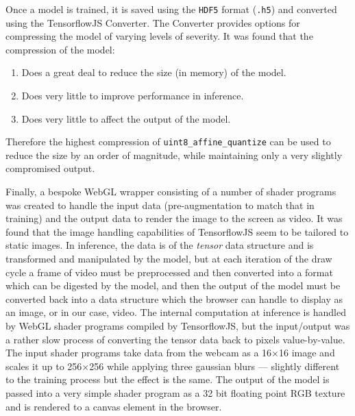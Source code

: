 \documentclass{article}
\begin{document}
Once a model is trained, it is saved using the \verb|HDF5| format (\verb|.h5|) and converted using the TensorflowJS Converter. The Converter provides options for compressing the model of varying levels of severity. It was found that the compression of the model:

\begin{enumerate}
	\item Does a great deal to reduce the size (in memory) of the model.
	\item Does very little to improve performance in inference.
	\item Does very little to affect the output of the model.
\end{enumerate}

Therefore the highest compression of \verb|uint8_affine_quantize| can be used to reduce the size by an order of magnitude, while maintaining only a very slightly compromised output.

Finally, a bespoke WebGL wrapper consisting of a number of shader programs was created to handle the input data (pre-augmentation to match that in training) and the output data to render the image to the screen as video. It was found that the image handling capabilities of TensorflowJS seem to be tailored to static images. In inference, the data is of the \textit{tensor} data structure and is transformed and manipulated by the model, but at each iteration of the draw cycle a frame of video must be preprocessed and then converted into a format which can be digested by the model, and then the output of the model must be converted back into a data structure which the browser can handle to display as an image, or in our case, video. The internal computation at inference is handled by WebGL shader programs compiled by TensorflowJS, but the input/output was a rather slow process of converting the tensor data back to pixels value-by-value. The input shader programs take data from the webcam as a 16$\times$16 image and scales it up to 256$\times$256 while applying three gaussian blurs --- slightly different to the training process but the effect is the same. The output of the model is passed into a very simple shader program as a 32 bit floating point RGB texture and is rendered to a canvas element in the browser.

\end{document}
